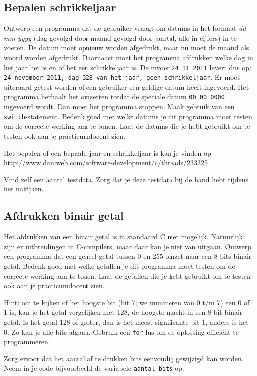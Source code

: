 \documentclass[a4paper,10pt,fleqn,twoside]{article}
\begin{document}
\subsection{Bepalen schrikkeljaar}\label{sec:bepalen-schrikkeljaar}
Ontwerp een programma dat de gebruiker vraagt om datums in het formaat \textsl{dd mm yyyy} (dag gevolgd door maand gevolgd door jaartal, alle in cijfers) in te voeren. De datum moet opnieuw worden afgedrukt, maar nu moet de maand als woord worden afgedrukt. Daarnaast moet het programma afdrukken welke dag in het jaar het is en of het een schrikkeljaar is. De invoer \texttt{24 11 2011} levert dus op: \texttt{24 november 2011, dag 328 van het jaar, geen schrikkeljaar}. Er moet uiteraard getest worden of een gebruiker een geldige datum heeft ingevoerd. Het programma herhaalt het omzetten totdat de speciale datum \texttt{00 00 0000} ingevoerd wordt. Dan moet het programma stoppen. Maak gebruik van een \lstinline|switch|-statement. Bedenk goed met welke datums je dit programma moet testen om de correcte werking aan te tonen. Laat de datums die je hebt gebruikt om te testen ook aan je practicumdocent zien.

Het bepalen of een bepaald jaar en schrikkeljaar is kan je vinden op \url{http://www.daniweb.com/software-development/c/threads/233325}

Vind zelf een aantal testdata. Zorg dat je deze testdata bij de hand hebt tijdens het nakijken.

\subsection{Afdrukken binair getal}
Het afdrukken van een binair getal is in standaard C niet mogelijk. Natuurlijk zijn er uitbreidingen in C-compilers, maar daar kan je niet van uitgaan. Ontwerp een programma dat een geheel getal tussen 0 en 255 omzet naar een 8-bits binair getal. Bedenk goed met welke getallen je dit programma moet testen om de correcte werking aan te tonen. Laat de getallen die je hebt gebruikt om te testen ook aan je practicumdocent zien.

Hint: om te kijken of het hoogste bit (bit 7; we nummeren van 0 t/m 7) een 0 of 1 is, kan je het getal vergelijken met 128, de hoogste macht in een 8-bit binair getal. Is het getal 128 of groter, dan is het meest significante bit 1, anders is het 0. Zo kan je alle bits afgaan. Gebruik een \lstinline|for|-lus om de oplossing efficiënt te programmeren.

Zorg ervoor dat het aantal af te drukken bits eenvoudig gewijzigd kan worden. Neem in je code bijvoorbeeld de variabele \lstinline|aantal_bits| op:
\end{document}
